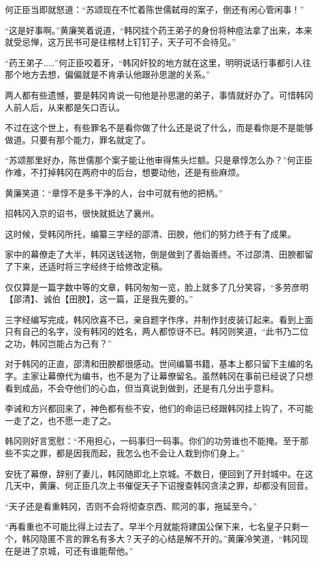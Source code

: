 何正臣当即就怒道：“苏颂现在不忙着陈世儒弑母的案子，倒还有闲心管闲事！”

“这是好事啊。”黄廉笑着说道，“韩冈挂个药王弟子的身份将种痘法拿了出来，本来就受忌惮，这万民书可是往棺材上钉钉子，天子可不会待见。”

“药王弟子……”何正臣咬着牙，“韩冈奸狡的地方就在这里，明明说话行事都引人往那个地方去想，偏偏就是不肯承认他跟孙思邈的关系。”

两人都有些遗憾，要是韩冈肯说一句他是孙思邈的弟子，事情就好办了。可惜韩冈人前人后，从来都是矢口否认。

不过在这个世上，有些罪名不是看你做了什么还是说了什么，而是看你是不是能够做道。只要有那个能力，罪名就定了。

“苏颂那里好办，陈世儒那个案子能让他审得焦头烂额。只是章惇怎么办？”何正臣作难，不打掉韩冈在两府中的后台，想要动他，还是有些麻烦。

黄廉笑道：“章惇不是多干净的人，台中可就有他的把柄。”

招韩冈入京的诏书，很快就抵达了襄州。

这时候，受韩冈所托，编纂三字经的邵清、田腴，他们的努力终于有了成果。

家中的幕僚走了大半，韩冈送钱送物，倒是做到了善始善终。不过邵清、田腴都留了下来，还适时将三字经终于给修改定稿。

仅仅算是一篇字数中等的文章，韩冈匆匆一览，脸上就多了几分笑容，“多劳彦明【邵清】、诚伯【田腴】，这一篇，正是我先要的。”

三字经编写完成，韩冈欣喜不已，亲自题字作序，并制作封皮装订起来。看到上面只有自己的名字，没有韩冈的姓名，两人都惊讶不已。韩冈则笑道，“此书乃二位之功，韩冈岂能占为己有？”

对于韩冈的正直，邵清和田腴都很感动。世间编纂书籍，基本上都只留下主编的名字。主家让幕僚代为编书，也不是为了让幕僚留名。虽然韩冈在事前已经说了只想看到成品，不会夺他们的心血，但当真说到做到，还是有几分出乎意料。

李诫和方兴都回来了，神色都有些不安，他们的命运已经跟韩冈挂上钩了，不可能一走了之，也不愿一走了之。

韩冈则好言宽慰：“不用担心，一码事归一码事。你们的功劳谁也不能掩。至于那些不实之罪，都是因我而起，我怎么也不会让人栽到你们身上。”

安抚了幕僚，辞别了妻儿，韩冈随即北上京城。不数日，便回到了开封城中。在这几天中，黄廉、何正臣几次上书催促天子下诏搜查韩冈贪渎之罪，却都没有回音。

“天子还是看重韩冈，否则不会将彻查京西、熙河的事，拖延至今。”

“再看重也不可能比得上过去了。早半个月就能将建国公保下来，七名皇子只剩一个，韩冈隐匿不言的罪名有多大？天子的心结是解不开的。”黄廉冷笑道，“韩冈现在是进了京城，可还有谁能帮他。”

